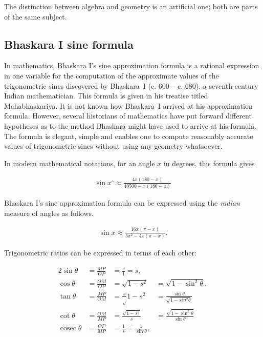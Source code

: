 {The distinction between algebra and geometry is an artificial one; both are parts of the same subject.

\subsection*{Bhaskara I sine formula}

In mathematics, Bhaskara I's sine approximation formula is a rational expression in one variable for the computation of the approximate values of the trigonometric sines discovered by Bhaskara~I (c. 600 – c. 680), a seventh-century Indian mathematician. This formula is given in his treatise titled Mahabhaskariya. It is not known how Bhaskara~I arrived at his approximation formula. However, several historians of mathematics have put forward different hypotheses as to the method Bhaskara might have used to arrive at his formula. The formula is elegant, simple and enables one to compute reasonably accurate values of trigonometric sines without using any geometry whatsoever.

In modern mathematical notations, for an angle $x$ in degrees, this formula gives

\begin{gather} \sin x^\circ \approx \frac{4 x (180-x)}{40500 - x(180-x)} \end{gather}


Bhaskara I's sine approximation formula can be expressed using the \emph{radian} measure of angles as follows.

\begin{gather}\sin x \approx \frac{16x (\pi - x)}{5\pi^2 - 4x (\pi - x)}.\end{gather}



Trigonometric ratios can be expressed in terms of each other:

\begin{alignat}{2}
\sin \theta &= \frac{MP}{OP}  &= \frac{s}{1}=s,        &                       \\
\cos \theta &= \frac{OM}{OP} &= \sqrt{1-s^2}           &=\sqrt{1-\sin^2\theta},\\
\tan \theta &= \frac{MP}{OM} &= \frac{s}\sqrt{1-s^2}   &=\frac{\sin \theta}{\sqrt{1-sin^2\theta}}\\
\cot \theta &= \frac{OM}{MP} & = \frac{\sqrt{1-s^2}}{s}&=\frac{\sqrt{1-\sin^2\theta}}{\sin\theta}\\
\operatorname{cosec}\theta  &= \frac{OP}{MP} & = \frac{1}{s}=\frac{1}{\sin\theta}, &
\end{alignat}

}
